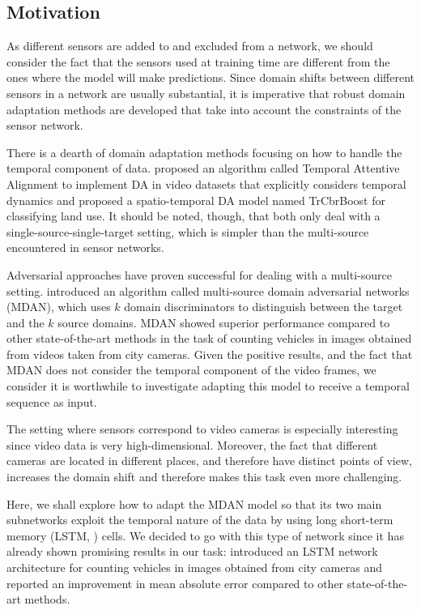 \subsection{Motivation}
As different sensors are added to and excluded from a network, we should consider the fact that the sensors used at training time are different from the ones where the model will make predictions. Since domain shifts between different sensors in a network are usually substantial, it is imperative that robust domain adaptation methods are developed that take into account the constraints of the sensor network.

There is a dearth of domain adaptation methods focusing on how to handle the temporal component of data. \citet{Chen2019} proposed an algorithm called Temporal Attentive Alignment to implement DA in video datasets that explicitly considers temporal dynamics and \citet{Liu2014} proposed a spatio-temporal DA model named TrCbrBoost for classifying land use. It should be noted, though, that both only deal with a single-source-single-target setting, which is simpler than the multi-source encountered in sensor networks.

Adversarial approaches have proven successful for dealing with a multi-source setting. \citet{Zhao2018} introduced an algorithm called multi-source domain adversarial networks (MDAN), which uses $k$ domain discriminators to distinguish between the target and the $k$ source domains. MDAN showed superior performance compared to other state-of-the-art methods in the task of counting vehicles in images obtained from videos taken from city cameras. Given the positive results, and the fact that MDAN does not consider the temporal component of the video frames, we consider it is worthwhile to investigate adapting this model to receive a temporal sequence as input.

The setting where sensors correspond to video cameras is especially interesting since video data is very high-dimensional. Moreover, the fact that different cameras are located in different places, and therefore have distinct points of view, increases the domain shift and therefore makes this task even more challenging.

Here, we shall explore how to adapt the MDAN model so that its two main subnetworks exploit the temporal nature of the data by using long short-term memory (LSTM, \citet{Hochreiter1997}) cells. We decided to go with this type of network since it has already shown promising results in our task: \citet{Zhang2017} introduced an LSTM network architecture for counting vehicles in images obtained from city cameras and reported an improvement in mean absolute error compared to other state-of-the-art methods.

